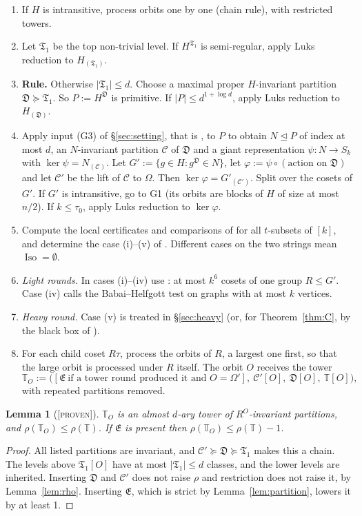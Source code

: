 \documentclass[11pt]{article}
\newtheorem{lemma}[theorem]{Lemma}
\theoremstyle{definition}
\theoremstyle{remark}
\newcommand{\Iso}{\operatorname{Iso}}
\newcommand{\C}{\mathcal C}
\newcommand{\T}{\mathbb T}
\newcommand{\fT}{\mathfrak T}
\newcommand{\fD}{\mathfrak D}
\newcommand{\fE}{\mathfrak E}
\newcommand{\Proven}{\textsc{[proven]}}
\begin{document}
\begin{enumerate}
\item[G1.] If $H$ is intransitive, process orbits one by one (chain rule), with restricted towers.
\item[G2.] Let $\fT_1$ be the top non-trivial level. If $H^{\fT_1}$ is semi-regular, apply Luks reduction to $H_{(\fT_1)}$.
\item[G3.] \textbf{Rule.} Otherwise $|\fT_1|\le d$. Choose a maximal proper $H$-invariant partition $\fD\succeq\fT_1$. So $P:=H^{\fD}$ is primitive. If $|P|\le d^{1+\log d}$, apply Luks reduction to $H_{(\fD)}$.
\item[G4.] Apply input (G3) of \S\ref{sec:setting}, that is \cite[Lemma~7.1]{GNS}, to $P$ to obtain $N\trianglelefteq P$ of index at most $d$, an $N$-invariant partition $\C$ of $\fD$ and a giant representation $\psi\colon N\to S_k$ with $\ker\psi=N_{(\C)}$. Let $G':=\{g\in H:g^{\fD}\in N\}$, let $\varphi:=\psi\circ(\text{action on }\fD)$ and let $\C'$ be the lift of $\C$ to $\Omega$. Then $\ker\varphi=G'_{(\C')}$. Split over the cosets of $G'$. If $G'$ is intransitive, go to G1 (its orbits are blocks of $H$ of size at most $n/2$). If $k\le\tau_0$, apply Luks reduction to $\ker\varphi$.
\item[G5.] Compute the local certificates and comparisons of \cite[\S6]{GNS} for all $t$-subsets of $[k]$, and determine the case (i)--(v) of \cite[App.~A]{GNS}. Different cases on the two strings mean $\Iso=\emptyset$.
\item[G6.] \emph{Light rounds.} In cases (i)--(iv) use \cite[Lemmas~6.7, 6.9]{GNS}: at most $k^6$ cosets of one group $R\le G'$. Case (iv) calls the Babai--Helfgott test on graphs with at most $k$ vertices.
\item[G7.] \emph{Heavy round.} Case (v) is treated in \S\ref{sec:heavy} (or, for Theorem~\ref{thm:C}, by the black box of \cite[Lemma~6.7]{GNS}).
\item[G8.] For each child coset $R\tau$, process the orbits of $R$, a largest one first, so that the large orbit is processed under $R$ itself. The orbit $O$ receives the tower
\[
\T_O:=\bigl([\fE\ \text{if a tower round produced it and } O=\Omega'],\ \C'[O],\ \fD[O],\ \T[O]\bigr),
\]
with repeated partitions removed.
\end{enumerate}

\begin{lemma}[\Proven]\label{lem:maintained}
$\T_O$ is an almost $d$-ary tower of $R^O$-invariant partitions, and $\rho(\T_O)\le\rho(\T)$. If $\fE$ is present then $\rho(\T_O)\le\rho(\T)-1$.
\end{lemma}
\begin{proof}
All listed partitions are invariant, and $\C'\succeq\fD\succeq\fT_1$ makes this a chain. The levels above $\fT_1[O]$ have at most $|\fT_1|\le d$ classes, and the lower levels are inherited. Inserting $\fD$ and $\C'$ does not raise $\rho$ and restriction does not raise it, by Lemma~\ref{lem:rho}. Inserting $\fE$, which is strict by Lemma~\ref{lem:partition}, lowers it by at least 1.
\end{proof}
\end{document}
